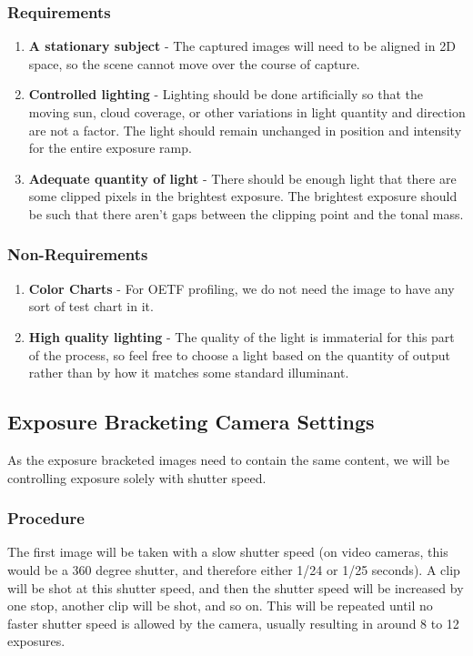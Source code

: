 \documentclass[twoside]{article}
\begin{document}
\subsubsection*{Requirements}
\begin{enumerate}
    \item \textbf{A stationary subject} - The captured images will need to be aligned in 2D space, so the scene cannot move over the course of capture.
    \item \textbf{Controlled lighting} - Lighting should be done artificially so that the moving sun, cloud coverage, or other variations in light quantity and direction are not a factor. The light should remain unchanged in position and intensity for the entire exposure ramp.
    \item \textbf{Adequate quantity of light} - There should be enough light that there are some clipped pixels in the brightest exposure. The brightest exposure should be such that there aren't gaps between the clipping point and the tonal mass.
\end{enumerate}

\subsubsection*{Non-Requirements}
\begin{enumerate}
    \item \textbf{Color Charts} - For OETF profiling, we do not need the image to have any sort of test chart in it.
    \item \textbf{High quality lighting} - The quality of the light is immaterial for this part of the process, so feel free to choose a light based on the quantity of output rather than by how it matches some standard illuminant.
\end{enumerate}

\subsection*{Exposure Bracketing Camera Settings}
As the exposure bracketed images need to contain the same content, we will be controlling exposure solely with shutter speed.

\subsubsection*{Procedure}
The first image will be taken with a slow shutter speed (on video cameras, this would be a 360 degree shutter, and therefore either 1/24 or 1/25 seconds). A clip will be shot at this shutter speed, and then the shutter speed will be increased by one stop, another clip will be shot, and so on. This will be repeated until no faster shutter speed is allowed by the camera, usually resulting in around 8 to 12 exposures.
\end{document}
